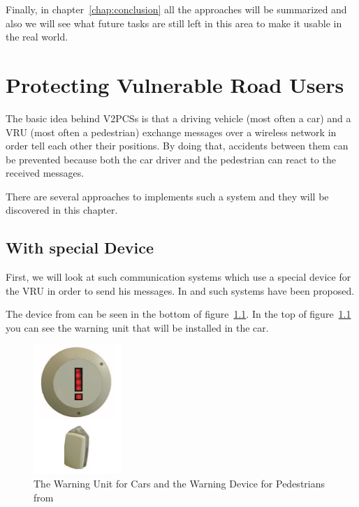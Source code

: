 \documentclass[]{ccs-thesis}
\begin{document}
Finally, in chapter~\ref{chap:conclusion} all the approaches will be summarized and also we will see what future tasks are still left in this area to make it usable in the real world.


\chapter{Protecting Vulnerable Road Users}
\label{chap:v2p}

The basic idea behind \acp{V2PCS} is that a driving vehicle (most often a car) and a \ac{VRU} (most often a pedestrian) exchange messages over a wireless network in order tell each other their positions. By doing that, accidents between them can be prevented because both the car driver and the pedestrian can react to the received messages.

There are several approaches to implements such a system and they will be discovered in this chapter.

\section{With special Device}\label{sec:special device}

First, we will look at such communication systems which use a special device for the \ac{VRU} in order to send his messages. In \cite{v2pprotection} and \cite{watchover} such systems have been proposed. 

The device from \cite{v2pprotection} can be seen in the bottom of figure~\ref{fig:device}. In the top of figure~\ref{fig:device} you can see the warning unit that will be installed in the car.

\begin{figure}[h]
	\centering
	\includegraphics[width=0.3\textwidth]{figures/1_device}
	\caption{The Warning Unit for Cars and the Warning Device for Pedestrians from \cite{v2pprotection}}%
	\label{fig:device}%
\end{figure}
\end{document}

